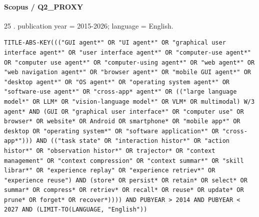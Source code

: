 \noindent\begin{minipage}{\linewidth}
\paragraph{Scopus / Q2\_PROXY}
25 .
publication year = 2015-2026; language = English.
\begin{lstlisting}
TITLE-ABS-KEY((("GUI agent*" OR "UI agent*" OR "graphical user interface agent*" OR "user interface agent*" OR "computer-use agent*" OR "computer use agent*" OR "computer-using agent*" OR "web agent*" OR "web navigation agent*" OR "browser agent*" OR "mobile GUI agent*" OR "desktop agent*" OR "OS agent*" OR "operating system agent*" OR "software-use agent*" OR "cross-app* agent*" OR (("large language model*" OR LLM* OR "vision-language model*" OR VLM* OR multimodal) W/3 agent* AND (GUI OR "graphical user interface*" OR "computer use" OR browser* OR website* OR Android OR smartphone* OR "mobile app*" OR desktop OR "operating system*" OR "software application*" OR "cross-app*"))) AND (("task state" OR "interaction histor*" OR "action histor*" OR "observation histor*" OR trajector* OR "context management" OR "context compression" OR "context summar*" OR "skill librar*" OR "experience replay" OR "experience retriev*" OR "experience reuse") AND (store* OR persist* OR retain* OR select* OR summar* OR compress* OR retriev* OR recall* OR reuse* OR update* OR prune* OR forget* OR recover*)))) AND PUBYEAR > 2014 AND PUBYEAR < 2027 AND (LIMIT-TO(LANGUAGE, "English"))
\end{lstlisting}
\end{minipage}\par\medskip
